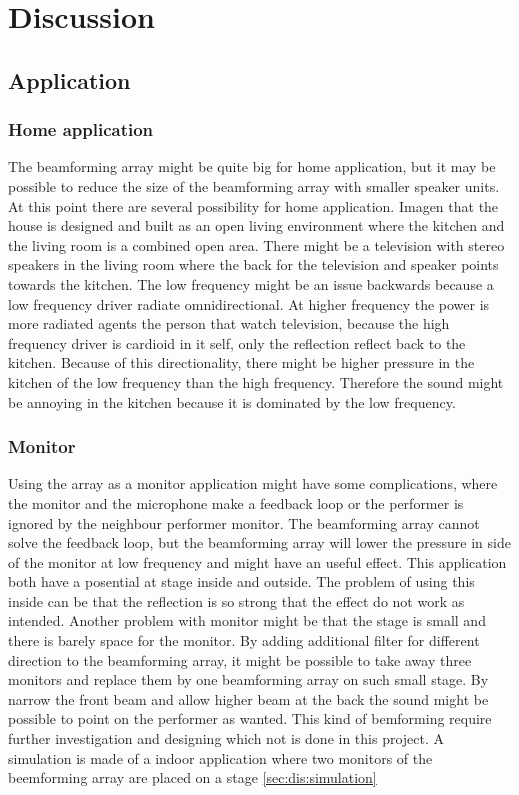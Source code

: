 \chapter{Discussion}



\section{Application}

\subsection{Home application}
The beamforming array might be quite big for home application, but it may be possible to reduce the size of the beamforming array with smaller speaker units. At this point there are several possibility for home application. Imagen that the house is designed and built as an open living environment where the kitchen and the living room is a combined open area. There might be a television with stereo speakers in the living room where the back for the television and speaker points towards the kitchen. The low frequency might be an issue backwards because a low frequency driver radiate omnidirectional. At higher frequency the power is more radiated agents the person that watch television, because the high frequency driver is cardioid in it self, only the reflection reflect back to the kitchen. Because of this directionality, there might be higher pressure in the kitchen of the low frequency than the high frequency. Therefore the sound might be annoying in the kitchen because it is dominated by the low frequency. 
 




\subsection{Monitor}
Using the array as a monitor application might have some complications, where the monitor and the microphone make a feedback loop or the performer is ignored by the neighbour performer monitor. The beamforming array cannot solve the feedback loop, but the beamforming array will lower the pressure in side of the monitor at low frequency and might have an useful effect. This application both have a posential at stage inside and outside. The problem of using this inside can be that the reflection is so strong that the effect do not work as intended. Another problem with monitor might be that the stage is small and there is barely space for the monitor. By adding additional filter for different direction to the beamforming array, it might be possible to take away three monitors and replace them by one beamforming array on such small stage. By narrow the front beam and allow higher beam at the back the sound might be possible to point on the performer as wanted. This kind of bemforming require further investigation and designing which not is done in this project. A simulation is made of a indoor application where two monitors of the beemforming array are placed on a stage \autoref{sec:dis:simulation}



